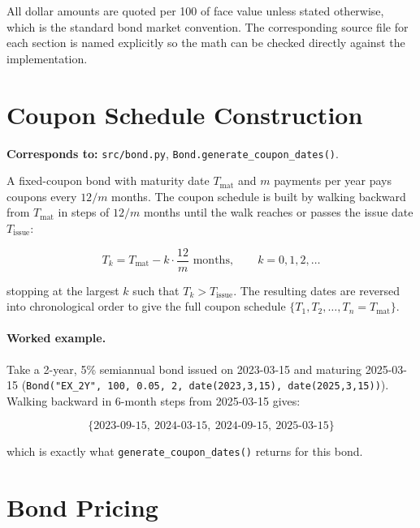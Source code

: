 \documentclass[11pt]{article}
\begin{document}
All dollar amounts are quoted per 100 of face value unless stated otherwise, which is the
standard bond market convention. The corresponding source file for each section is named
explicitly so the math can be checked directly against the implementation.

\section{Coupon Schedule Construction}
\label{sec:schedule}

\textbf{Corresponds to:} \texttt{src/bond.py}, \texttt{Bond.generate\_coupon\_dates()}.

A fixed-coupon bond with maturity date $T_{\text{mat}}$ and $m$ payments per year pays coupons
every $12/m$ months. The coupon schedule is built by walking backward from $T_{\text{mat}}$ in
steps of $12/m$ months until the walk reaches or passes the issue date $T_{\text{issue}}$:

\[
  T_k = T_{\text{mat}} - k \cdot \frac{12}{m} \text{ months}, \qquad k = 0, 1, 2, \dots
\]

stopping at the largest $k$ such that $T_k > T_{\text{issue}}$. The resulting dates are
reversed into chronological order to give the full coupon schedule
$\{T_1, T_2, \dots, T_n = T_{\text{mat}}\}$.

\paragraph{Worked example.} Take a 2-year, 5\% semiannual bond issued on 2023-03-15 and
maturing 2025-03-15 (\texttt{Bond("EX\_2Y", 100, 0.05, 2, date(2023,3,15), date(2025,3,15))}).
Walking backward in 6-month steps from 2025-03-15 gives:

\[
  \{2023\text{-}09\text{-}15,\ 2024\text{-}03\text{-}15,\ 2024\text{-}09\text{-}15,\ 2025\text{-}03\text{-}15\}
\]

which is exactly what \texttt{generate\_coupon\_dates()} returns for this bond.

\section{Bond Pricing}
\label{sec:pricing}
\end{document}
